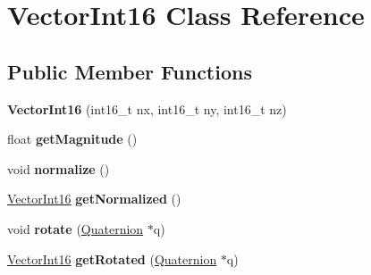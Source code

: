 \hypertarget{class_vector_int16}{\section{Vector\+Int16 Class Reference}
\label{class_vector_int16}
}
\subsection*{Public Member Functions}
\begin{DoxyCompactItemize}
\item 
\hypertarget{class_vector_int16_acce45f37b3f90df1d5aff6edbf12f02b}{{\bfseries Vector\+Int16} (int16\+\_\+t nx, int16\+\_\+t ny, int16\+\_\+t nz)}\label{class_vector_int16_acce45f37b3f90df1d5aff6edbf12f02b}

\item 
\hypertarget{class_vector_int16_aeb8087ac5732450bc18ac944a16d0694}{float {\bfseries get\+Magnitude} ()}\label{class_vector_int16_aeb8087ac5732450bc18ac944a16d0694}

\item 
\hypertarget{class_vector_int16_aefdadb30fbc20b564bbbf0b1a885e349}{void {\bfseries normalize} ()}\label{class_vector_int16_aefdadb30fbc20b564bbbf0b1a885e349}

\item 
\hypertarget{class_vector_int16_a1f2c17ac660f1e90a095f9e7914200c5}{\hyperlink{class_vector_int16}{Vector\+Int16} {\bfseries get\+Normalized} ()}\label{class_vector_int16_a1f2c17ac660f1e90a095f9e7914200c5}

\item 
\hypertarget{class_vector_int16_ac7bf149db0a2b66d7683b87ebeb2dfc5}{void {\bfseries rotate} (\hyperlink{class_quaternion}{Quaternion} $\ast$q)}\label{class_vector_int16_ac7bf149db0a2b66d7683b87ebeb2dfc5}

\item 
\hypertarget{class_vector_int16_a9e1d9f4553b069bf353e807f130a285b}{\hyperlink{class_vector_int16}{Vector\+Int16} {\bfseries get\+Rotated} (\hyperlink{class_quaternion}{Quaternion} $\ast$q)}\label{class_vector_int16_a9e1d9f4553b069bf353e807f130a285b}

\end{DoxyCompactItemize}
